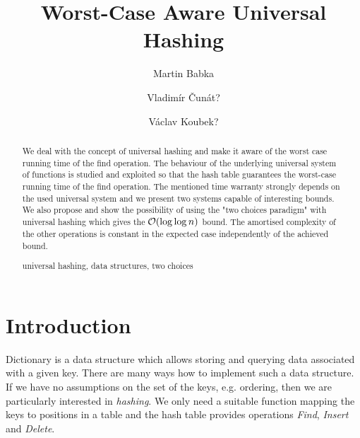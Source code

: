 \documentclass[runningheads,a4paper]{llncs}
\newcommand{\keywords}[1]{\par\addvspace\baselineskip
\noindent\keywordname\enspace\ignorespaces#1}
\begin{document}
\mainmatter

\author{Martin Babka
\and Vladimír Čunát? \and Václav Koubek?}

\title{Worst-Case Aware Universal Hashing}



\maketitle

\begin{abstract}
We deal with the concept of universal hashing and make it aware of the worst case running time of the find operation. 
The behaviour of the underlying universal system of functions is studied and exploited so that the hash table guarantees the worst-case running time of the find operation.
The mentioned time warranty strongly depends on the used universal system and we present two systems capable of interesting bounds. 
We also propose and show the possibility of using the "two choices paradigm" with universal hashing which gives the $\mathcal{O}(\log \log n)$ bound.
The amortised complexity of the other operations is constant in the expected case independently of the achieved bound.

\keywords{universal hashing, data structures, two choices}
\end{abstract}

\section{Introduction}
Dictionary is a data structure which allows storing and querying data associated with a given key. There are many ways how to implement such a data structure. If we have no assumptions on the set of the keys, e.g. ordering, then we are particularly interested in \emph{hashing}. We only need a suitable function mapping the keys to positions in a table and the hash table provides operations \emph{Find}, \emph{Insert} and \emph{Delete}. 
\end{document}
